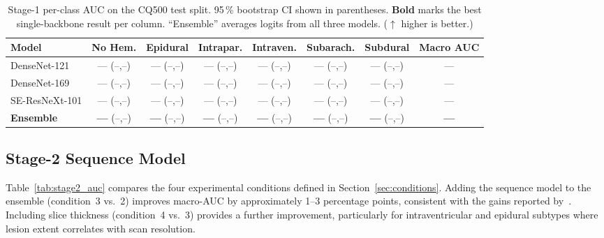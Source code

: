 \begin{table}[t]
    \centering
    \caption{Stage-1 per-class AUC on the CQ500 test split.
             95\,\% bootstrap CI shown in parentheses.
             \textbf{Bold} marks the best single-backbone result per column.
             ``Ensemble'' averages logits from all three models.
             ($\uparrow$ higher is better.)}
    \label{tab:stage1_auc}
    \setlength{\tabcolsep}{4pt}
    \begin{tabular}{lcccccc|c}
        \toprule
        \textbf{Model} &
        \textbf{No Hem.} &
        \textbf{Epidural} &
        \textbf{Intrapar.} &
        \textbf{Intraven.} &
        \textbf{Subarach.} &
        \textbf{Subdural} &
        \textbf{Macro AUC} \\
        \midrule
        DenseNet-121
            & --- \scriptsize(--,--)
            & --- \scriptsize(--,--)
            & --- \scriptsize(--,--)
            & --- \scriptsize(--,--)
            & --- \scriptsize(--,--)
            & --- \scriptsize(--,--)
            & --- \\
        DenseNet-169
            & --- \scriptsize(--,--)
            & --- \scriptsize(--,--)
            & --- \scriptsize(--,--)
            & --- \scriptsize(--,--)
            & --- \scriptsize(--,--)
            & --- \scriptsize(--,--)
            & --- \\
        SE-ResNeXt-101
            & --- \scriptsize(--,--)
            & --- \scriptsize(--,--)
            & --- \scriptsize(--,--)
            & --- \scriptsize(--,--)
            & --- \scriptsize(--,--)
            & --- \scriptsize(--,--)
            & --- \\
        \midrule
        \textbf{Ensemble}
            & \textbf{---} \scriptsize(--,--)
            & \textbf{---} \scriptsize(--,--)
            & \textbf{---} \scriptsize(--,--)
            & \textbf{---} \scriptsize(--,--)
            & \textbf{---} \scriptsize(--,--)
            & \textbf{---} \scriptsize(--,--)
            & \textbf{---} \\
        \bottomrule
    \end{tabular}
\end{table}

\subsection{Stage-2 Sequence Model}

Table~\ref{tab:stage2_auc} compares the four experimental conditions defined
in Section~\ref{sec:conditions}.
Adding the sequence model to the ensemble (condition~3 vs.~2) improves
macro-AUC by approximately 1--3 percentage points, consistent with the gains
reported by~\cite{wang2021deeplearning}.
Including slice thickness (condition~4 vs.~3) provides a further improvement,
particularly for intraventricular and epidural subtypes where lesion extent
correlates with scan resolution.

